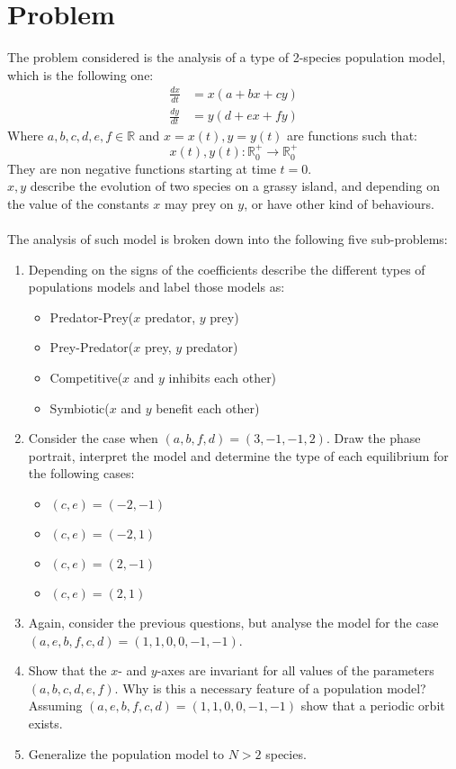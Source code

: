 \section*{Problem}
\label{sec:prob}
The problem considered is the analysis  of a type of 2-species population model, which is the following one:
\begin{subequations}\label{eqn:syseqs}
\begin{align}
    \frac{d x}{dt} & = x(a+bx+cy) \label{eqn:syseq1} \\
    \frac{d y}{dt} & = y(d+ex+fy) \label{eqn:syseq2}
\end{align}
\end{subequations}
Where $a,b,c,d,e,f \in \mathbb{R}$ and $x=x(t), y=y(t)$ are functions such that:
$$x(t),y(t): \mathbb{R}_0^+ \to \mathbb{R}_0^+$$
They are non negative functions starting at time $t=0$.\\
$x,y$ describe the evolution of two species on a grassy island, and depending on the value of the constants $x$ may prey on $y$, or have other kind of behaviours.\\ \\
The analysis of such model is broken down into the following five sub-problems:
\begin{enumerate}
\item {Depending on the signs of the coefficients describe the different types of populations models and label those models as: 
\begin{itemize}
\item Predator-Prey($x$ predator, $y$ prey)
\item Prey-Predator($x$ prey, $y$ predator)
\item Competitive($x$ and $y$ inhibits each other)
\item Symbiotic($x$ and $y$ benefit each other)
\end{itemize}}
\item{Consider the case when $(a,b,f,d)=(3,-1,-1,2)$. Draw the phase portrait, interpret the model and determine the type of each equilibrium for the following cases:
\begin{itemize}
\item $(c,e) = (-2,-1)$
\item $(c,e) = (-2,1)$
\item $(c,e) = (2,-1)$
\item $(c,e) = (2,1)$
\end{itemize}}
\item {Again, consider the previous questions, but analyse the model for the case $(a,e,b,f,c,d)=(1,1,0,0,-1,-1)$.}
\item {Show that the $x$- and $y$-axes are invariant for all values of the parameters $(a,b,c,d,e,f)$. Why is this a necessary feature of a population model? Assuming $(a,e,b,f,c,d)=(1,1,0,0,-1,-1)$ show that a periodic orbit exists.}
\item {Generalize the population model to $N>2$ species.}
\end{enumerate}
